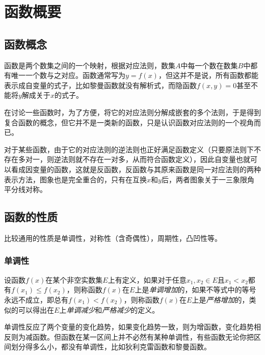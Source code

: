 
\section{函数概要}
\label{sec:function-general}


\subsection{函数概念}
\label{sec:function-concept}

函数是两个数集之间的一个映射，根据对应法则，数集$A$中每一个数在数集$B$中都有唯一一个数与之对应。函数通常写为$y=f(x)$，但这并不是说，所有函数都能表示成自变量的式子，比如黎曼函数就没有解析式，而隐函数$f(x,y)=0$甚至不能将$y$解成关于$x$的式子。

在讨论一些函数时，为了方便，将它的对应法则分解成嵌套的多个法则，于是得到复合函数的概念，但它并不是一类新的函数，只是认识函数对应法则的一个视角而已。

对于某些函数，由于它的对应法则的逆法则也正好满足函数定义（只要原法则下不存在多对一，则逆法则就不存在一对多，从而符合函数定义），因此自变量也就可以看成因变量的函数，这就是反函数，反函数与其原来函数是同一对应法则的两种表示方法，图象也是完全重合的，只有在互换$x$和$y$后，两者图象关于一三象限角平分线对称。

\subsection{函数的性质}
\label{sec:property-of-function}

比较通用的性质是单调性，对称性（含奇偶性），周期性，凸凹性等。

\subsubsection{单调性}
\label{sec:monotonicity-of-function}

\begin{definition}
  设函数$f(x)$在某个非空实数集$E$上有定义，如果对于任意$x_1,x_2 \in E$且$x_1<x_2$都有$f(x_1) \leqslant f(x_2)$，则称函数$f(x)$在$E$上是\emph{单调增加}的，如果不等式中的等号永远不成立，即总有$f(x_1)<f(x_2)$，则称函数$f(x)$在$E$上是\emph{严格增加}的，类似的可以得出在$E$上\emph{单调减少}和\emph{严格减少}的定义。
\end{definition}

单调性反应了两个变量的变化趋势，如果变化趋势一致，则为增函数，变化趋势相反则为减函数。但函数在某一区间上并不必然有某种单调性，有些函数无论你把区间划分得多么小，都没有单调性，比如狄利克雷函数和黎曼函数。

